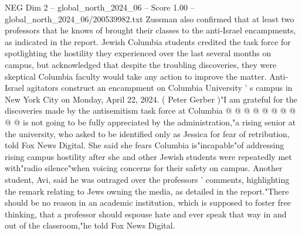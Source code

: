 \begin{textsample}{NEG Dim 2 – global\_north\_2024\_06 – Score 1.00 – global\_north\_2024\_06/200539982.txt}
Zussman also confirmed that at least two professors that he knows of brought their classes to the anti-Israel encampments, as indicated in the report.
Jewish Columbia students credited the task force for spotlighting the hostility they experienced over the last several months on campus, but acknowledged that despite the troubling discoveries, they were skeptical Columbia faculty would take any action to improve the matter.
Anti-Israel agitators construct an encampment on Columbia University ' s campus in New York City on Monday, April 22, 2024. ( Peter Gerber )"I am grateful for the discoveries made by the antisemitism task force at Columbia @ @ @ @ @ @ @ @ @ @ is not going to be fully appreciated by the administration,"a rising senior at the university, who asked to be identified only as Jessica for fear of retribution, told Fox News Digital.
She said she fears Columbia is"incapable"of addressing rising campus hostility after she and other Jewish students were repeatedly met with"radio silence"when voicing concerns for their safety on campus.
Another student, Avi, said he was outraged over the professors ' comments, highlighting the remark relating to Jews owning the media, as detailed in the report."There should be no reason in an academic institution, which is supposed to foster free thinking, that a professor should espouse hate and ever speak that way in and out of the classroom,"he told Fox News Digital.

\end{textsample}
